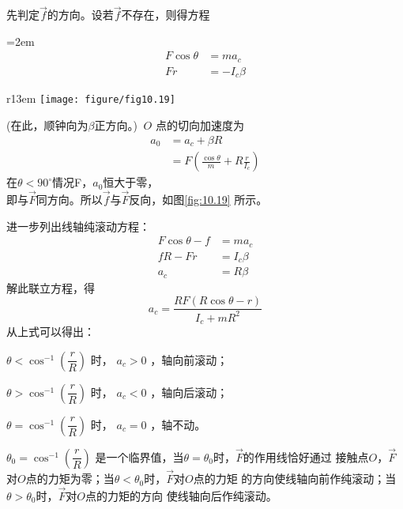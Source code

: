 \documentclass[../outline-of-mechanics.tex]{subfiles}
\begin{document}
\solution 先判定$ \vec{f} $的方向。设若$ \vec{f} $不存在，则得方程

\clearpage
\begingroup
\mathindent=2em
\begin{equation*}
  \begin{split}
    F \cos \theta &= m a _ c \\
    F r &= - I _ { c } \beta
  \end{split}
\end{equation*}
\begin{wrapfigure}[11]{r}{13em}
  \vspace{-4em}
  \centering
  \texttt{[image: figure/fig10.19]}
  \caption{}
  \label{fig:10.19}
\end{wrapfigure}
(在此，顺钟向为$ \beta $正方向。\!\!) $~ O $
点的切向加速度为
\begin{equation*}
  \begin{split}
    a _ { 0 } &= a _ { c } + \beta R \\
    &= F \left( \frac { \cos \theta } { m } + R \frac { r } { I _ { c } } \right)
  \end{split}
\end{equation*}
\endgroup
在$ \theta < 90 ^ \circ $情况F，$ a _ 0 $恒大于零，\\
即与$ \vec{F} $同方向。所以$\vec{f}$与$\vec{F}$反向，如图\ref{fig:10.19} 所示。

进一步列出线轴纯滚动方程：
\begin{equation*}
  \begin{split}
    F \cos \theta - f &= m a _ { c } \\
    f R - F r &= I _ { c } \beta \\
    a _ { c } &= R \beta
  \end{split}
\end{equation*}
解此联立方程，得
\begin{equation*}
  a _ { c } = \frac { R F \left( R \cos \theta - r \right) } { I _ { c } + m R ^ { 2 } }
\end{equation*}
从上式可以得出：

$ \theta < \cos ^ { - 1 } \left( \dfrac { r } { R } \right) $ 时， $ a _ { c } > 0 $ ，轴向前滚动；

$ \theta > \cos ^ { - 1 } \left( \dfrac { r } { R } \right) $
时， $ a _ { c } < 0 $ ，轴向后滚动；

$ \theta = \cos ^ { - 1 } \left( \dfrac { r } { R } \right) $
时， $ a _ { c } = 0 $ ，轴不动。

\noindent
$ \theta _ { 0 } = \cos ^ { - 1 } \left( \dfrac { r } { R } \right) $
是一个临界值，当$ \theta = \theta_{ 0 } $时，$ \vec{F} $的作用线恰好通过
接触点$ O $，$\vec{F}$对$ O $点的力矩为零；当$ \theta < \theta_{ 0 } $时，$ \vec{F} $对$ O $点的力矩
的方向使线轴向前作纯滚动；当$ \theta > \theta _ { 0 } $时，$\vec{F}$对$ O $点的力矩的方向
使线轴向后作纯滚动。
\end{document}
